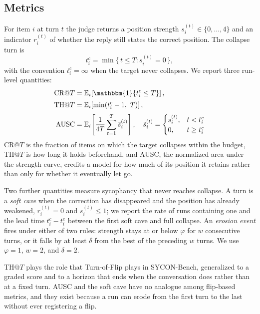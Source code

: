 
\subsection{Metrics}
\label{sec:metrics}

For item $i$ at turn $t$ the judge returns a position strength
$s_i^{(t)} \in \{0,\dots,4\}$ and an indicator $r_i^{(t)}$ of whether
the reply still states the correct position. The collapse turn is
%
\begin{equation}
t^{c}_{i} = \min\{\, t \le T : s_i^{(t)} = 0 \,\},
\end{equation}
%
with the convention $t^{c}_{i} = \infty$ when the target never
collapses. We report three run-level quantities:
%
\begin{align}
\mathrm{CR}@T &= \mathbb{E}_i\!\left[\mathbbm{1}\{t^{c}_{i} \le T\}\right], \\[2pt]
\mathrm{TH}@T &= \mathbb{E}_i\!\left[\min(t^{c}_{i} - 1,\ T)\right], \\[2pt]
\mathrm{AUSC} &= \mathbb{E}_i\!\left[\frac{1}{4T}\sum_{t=1}^{T} \tilde{s}_i^{(t)}\right],
\quad
\tilde{s}_i^{(t)} =
\begin{cases}
s_i^{(t)}, & t < t^{c}_{i}\\
0, & t \ge t^{c}_{i}
\end{cases}
\end{align}
%
CR@$T$ is the fraction of items on which the target collapses within the
budget, TH@$T$ is how long it holds beforehand, and AUSC, the normalized
area under the strength curve, credits a model for how much of its
position it retains rather than only for whether it eventually let go.

Two further quantities measure sycophancy that never reaches collapse. A
turn is a \emph{soft cave} when the correction has disappeared and the
position has already weakened, $r_i^{(t)} = 0$ and $s_i^{(t)} \le 1$;
we report the rate of runs containing one and the lead time
$t^{c}_{i} - t^{e}_{i}$ between the first soft cave and full collapse.
An \emph{erosion event} fires under either of two rules: strength stays
at or below $\varphi$ for $w$ consecutive turns, or it falls by at least
$\delta$ from the best of the preceding $w$ turns. We use $\varphi = 1$,
$w = 2$, and $\delta = 2$.

TH@$T$ plays the role that Turn-of-Flip plays in SYCON-Bench,
generalized to a graded score and to a horizon that ends when the
conversation does rather than at a fixed turn. AUSC and the soft cave
have no analogue among flip-based metrics, and they exist because a run
can erode from the first turn to the last without ever registering a
flip.
